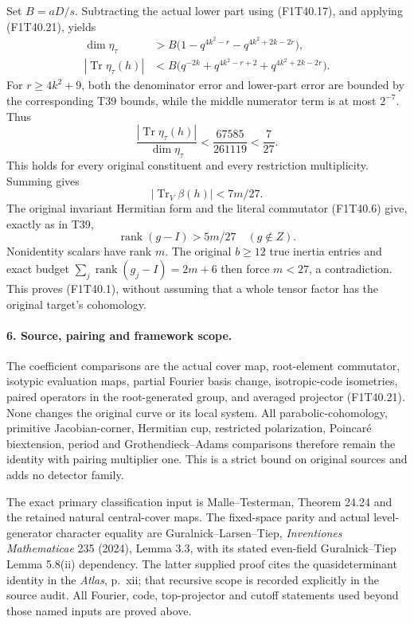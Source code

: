 Set \(B=aD/s\). Subtracting the actual lower part
using (F1T40.17), and applying (F1T40.21), yields
\[
\begin{split}
 \dim\eta_\tau&>
 B\bigl(1-q^{4k^2-r}-q^{4k^2+2k-2r}\bigr),\\
 |\operatorname{Tr}\eta_\tau(h)|&<
 B\bigl(q^{-2k}+q^{4k^2-r+2}+q^{4k^2+2k-2r}\bigr).
\end{split}
 \tag{F1T40.24}
\]
For \(r\ge4k^2+9\), both the denominator error and
lower-part error are bounded by the corresponding T39
bounds, while the middle numerator term is at most
\(2^{-7}\). Thus
\[
 \frac{|\operatorname{Tr}\eta_\tau(h)|}{\dim\eta_\tau}
 <\frac{67585}{261119}<\frac7{27}.
 \tag{F1T40.25}
\]
This holds for every original constituent and every
restriction multiplicity. Summing gives
\[
             |\operatorname{Tr}_V\beta(h)|<7m/27.
\]
The original invariant Hermitian form and the literal
commutator (F1T40.6) give, exactly as in T39,
\[
 \operatorname{rank}(g-I)>5m/27\quad(g\notin Z).
 \tag{F1T40.26}
\]
Nonidentity scalars have rank \(m\). The original
\(b\ge12\) true inertia entries and exact budget
\(\sum_j\operatorname{rank}(g_j-I)=2m+6\)
then force \(m<27\), a contradiction. This proves
(F1T40.1), without assuming that a whole tensor factor
has the original target's cohomology.

\paragraph{6. Source, pairing and framework scope.}
The coefficient comparisons are the actual cover map,
root-element commutator, isotypic evaluation maps,
partial Fourier basis change, isotropic-code isometries,
paired operators in the root-generated group, and
averaged projector (F1T40.21). None changes the original
curve or its local system. All parabolic-cohomology,
primitive Jacobian-corner, Hermitian cup, restricted
polarization, Poincar\'e biextension, period and
Grothendieck--Adams comparisons therefore remain the
identity with pairing multiplier one. This is a strict
bound on original sources and adds no detector family.

The exact primary classification input is
Malle--Testerman, Theorem 24.24 and the retained natural
central-cover maps. The fixed-space parity and actual
level-generator character equality are
Guralnick--Larsen--Tiep, \emph{Inventiones Mathematicae}
235 (2024), Lemma 3.3, with its stated even-field
Guralnick--Tiep Lemma 5.8(ii) dependency.
The latter supplied proof cites the quasideterminant
identity in the \emph{Atlas}, p.~xii; that recursive
scope is recorded explicitly in the source audit.
All Fourier, code, top-projector and cutoff statements
used beyond those named inputs are proved above.
